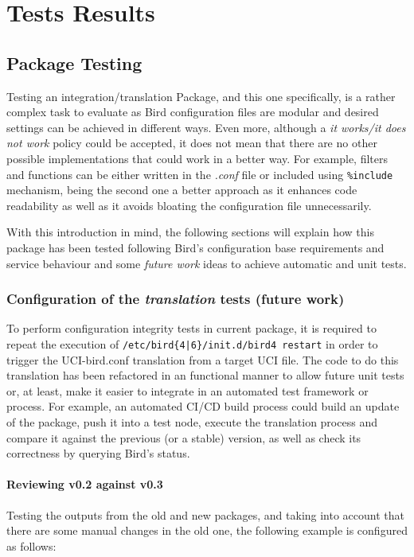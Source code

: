 \chapter{Tests Results}
\label{ch:tresults}

\section{Package Testing}
Testing an integration/translation Package, and this one specifically, is a rather complex task to evaluate as Bird configuration files are modular and desired settings can be achieved in different ways.
Even more, although a \textit{it works/it does not work} policy could be accepted, it does not mean that there are no other possible implementations that could work in a better way.
For example, filters and functions can be either written in the \textit{.conf} file or included using \texttt{\%include} mechanism, being the second one a better approach as it enhances code readability as well as it avoids bloating the configuration file unnecessarily.

With this introduction in mind, the following sections will explain how this package has been tested following Bird's configuration base requirements and service behaviour and some \textit{future work} ideas to achieve automatic and unit tests.


\subsection{Configuration of the \textit{translation} tests (future work)}
To perform configuration integrity tests in current package, it is required to repeat the execution of \texttt{/etc/bird\{4|6\}/init.d/bird4 restart} in order to trigger the UCI-bird.conf translation from a target UCI file. The code to do this translation has been refactored in an functional manner to allow future unit tests or, at least, make it easier to integrate in an automated test framework or process. For example, an automated CI/CD build process could build an update of the package, push it into a test node, execute the translation process and compare it against the previous (or a stable) version, as well as check its correctness by querying Bird's status.

\subsubsection{Reviewing v0.2 against v0.3}
Testing the outputs from the old and new packages, and taking into account that there are some manual changes in the old one, the following example is configured as follows:

